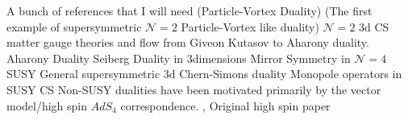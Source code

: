 A bunch of references that I will need (Particle-Vortex Duality) \cite{Peskin:1977kp, Dasgupta:1981zz, PhysRevB.39.2756} 
(The first example of supersymmetric $\mathcal{N}=2$ Particle-Vortex like duality) \cite{Aharony:1997bx}
$\mathcal{N}=2$ 3d CS matter gauge theories and flow from Giveon Kutasov to Aharony duality.\cite{Intriligator:2013lca}
Aharony Duality \cite{Aharony:1997gp}
Seiberg Duality in 3dimensions \cite{Karch:1997ux}
Mirror Symmetry in $\mathcal{N}=4$ SUSY \cite{Intriligator:1996ex}
General supersymmetric 3d Chern-Simons duality \cite{Aharony:2014uya}
Monopole operators in SUSY CS \cite{Aharony:2015pla}
Non-SUSY dualities have been motivated primarily by the vector model/high spin $AdS_4$ correspondence. \cite{Sezgin:2003pt, Klebanov:2002ja}, Original high spin paper \cite{Vasiliev:1992av}
%
%
%
